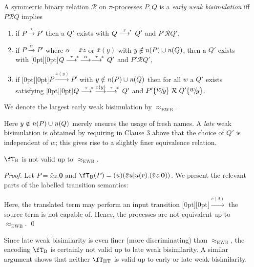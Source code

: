 \documentclass[runningheads]{llncs}
\newcommand{\fTHT}{\fT_{\textrm{HT}}}       %
\newcommand{\n}{{\it n}}                 %
\newcommand{\subs}[2]{\{\mathord{\raisebox{2pt}[0pt]{$#1$}\!/\!#2}\}} %
\newcommand{\plat}[1]{\raisebox{0pt}[0pt][0pt]{#1}}     %
\newcommand{\transtau}{\mathrel{\raisebox{0pt}[8pt][0pt]{$\stackrel{\tau}{\longrightarrow}$}^{\!*\,}}}
\newcommand{\wesim}{\ensuremath{\mathrel{\approx_{\mathrm{EWB}}}}}
\newcommand{\mrel}{\ensuremath{\mathrel{\mathcal{R}}}}
\begin{document}
\begin{definition}\rm\label{df:WB}
A symmetric binary relation {\mrel} on $\pi$-processes $P,Q$ is a {\em early weak
bisimulation} iff $P \mrel Q$ implies
\begin{enumerate}
\item if $P \stackrel{\tau}{\longrightarrow} P'$ then a $Q'$ exists with
  $Q \transtau Q'$ and $P'\mrel Q'$,
\item if $P \stackrel{\alpha}{\longrightarrow} P'$ where $\alpha\mathbin= \bar{x}z$ or
  $\bar{x}(y)$ with $y \mathbin{\notin} \n(P)\cup\n(Q)$,
  then a $Q'$ exists with
  \plat{$Q \transtau\stackrel{\alpha}{\longrightarrow}\transtau Q'$} and $P' \mrel Q'$,
\item if \plat{$P \stackrel{x(y)}{\longrightarrow} P'$} with $y \notin \n(P)\cup\n(Q)$ then for all $w$ a $Q'$
  exists satisfying \plat{$Q \transtau\stackrel{x(y)}{\longrightarrow} \transtau Q'$}
  and  $P'\subs{w}{y} \mrel Q'\subs{w}{y}$.
\end{enumerate}
We denote the largest early weak bisimulation by $\wesim$.
\end{definition}

\noindent
Here $y \notin \n(P)\cup\n(Q)$ merely ensures the usage of fresh names.
A \emph{late} weak bisimulation is obtained by requiring in Clause 3 above that the choice of
$Q'$ is independent of $w$; this gives rise to a slightly finer equivalence relation.

\begin{observation}\label{obs:boudolwesim}\rm
$\fT_{\rm B}$ is not valid up to $\wesim$.
\end{observation}

\begin{proof}
Let $P = \bar{x}z.\bm{0}$ and $\fT_{\rm B}(P) = (u)(\bar{x}u|u(v).(\bar{v}z|\bm{0}))$.
We present the relevant parts of the labelled transition semantics:
\begin{center}
\end{center}
Here, the translated term may perform an input transition \plat{$\stackrel{c(d)}{\longrightarrow}$} the source term is not capable of.
Hence, the processes are not equivalent up to $\wesim$.
\qed
\end{proof}
Since late weak bisimilarity is even finer (more discriminating) than $\wesim$, the encoding
$\fT_{\rm B}$ is certainly not valid up to late weak bisimilarity. A similar argument shows that neither
$\fTHT$ is valid up to early or late weak bisimilarity.
\end{document}
